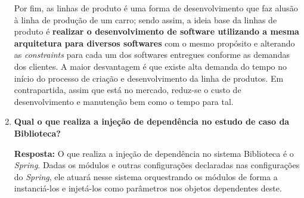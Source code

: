 \documentclass[12pt, a4paper]{article}
\newcommand{\tit}[1]{\textit{#1}}
\newcommand{\tb}[1]{\textbf{#1}}
\newcommand{\question}[1]{\item \tb{#1}}
\newcommand{\answer}[1]{\par \tb{Resposta:} #1}
\begin{document}
\begin{enumerate}[label=\textbf{\arabic*.}]
{            Por fim, as linhas de produto é uma forma de desenvolvimento que faz alusão à linha de produção de um carro; sendo assim, a ideia base da linhas de produto é \tb{realizar o desenvolvimento de software utilizando a mesma arquitetura para diversos softwares} com o mesmo propósito e alterando as \tit{constraints} para cada um dos softwares entregues conforme as demandas dos clientes. A maior desvantagem é que existe alta demanda do tempo no início do processo de criação e desenvolvimento da linha de produtos. Em contrapartida, assim que está no mercado, reduz-se o custo de desenvolvimento e manutenção bem como o tempo para tal.
        }
        
        \question{Qual o \fw que realiza a injeção de dependência no estudo de caso da Biblioteca?}
        \answer{ 
            O \fw que realiza a injeção de dependência no sistema Biblioteca é o \tit{Spring}. Dadas os módulos e outras configurações declaradas nas configurações do \tit{Spring}, ele atuará nesse sistema orquestrando os módulos de forma a instanciá-los e injetá-los como parâmetros nos objetos dependentes deste.
        }     
    
    \end{enumerate}
        
    
\end{document}
